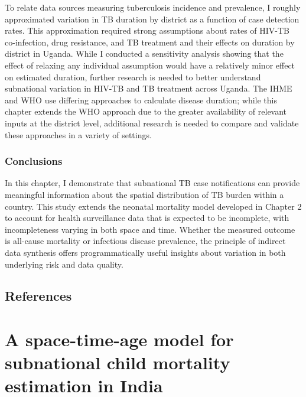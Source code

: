 \documentclass[
]{report}
\begin{document}
To relate data sources measuring tuberculosis incidence and prevalence, I roughly approximated variation in TB duration by district as a function of case detection rates. This approximation required strong assumptions about rates of HIV-TB co-infection, drug resistance, and TB treatment and their effects on duration by district in Uganda. While I conducted a sensitivity analysis showing that the effect of relaxing any individual assumption would have a relatively minor effect on estimated duration, further research is needed to better understand subnational variation in HIV-TB and TB treatment across Uganda. The IHME and WHO use differing approaches to calculate disease duration;\autocite{Ledesma2021,Glaziou2020} while this chapter extends the WHO approach due to the greater availability of relevant inputs at the district level, additional research is needed to compare and validate these approaches in a variety of settings.

\hypertarget{conclusions-1}{%
\subsection{Conclusions}\label{conclusions-1}}

In this chapter, I demonstrate that subnational TB case notifications can provide meaningful information about the spatial distribution of TB burden within a country. This study extends the neonatal mortality model developed in Chapter 2 to account for health surveillance data that is expected to be incomplete, with incompleteness varying in both space and time. Whether the measured outcome is all-cause mortality or infectious disease prevalence, the principle of indirect data synthesis offers programmatically useful insights about variation in both underlying risk and data quality.

\hypertarget{references-2}{%
\section{References}\label{references-2}}

\printbibliography[segment=\therefsegment,heading=none]

\hypertarget{a-space-time-age-model-for-subnational-child-mortality-estimation-in-india}{%
\chapter{A space-time-age model for subnational child mortality estimation in India}\label{a-space-time-age-model-for-subnational-child-mortality-estimation-in-india}}
\end{document}
